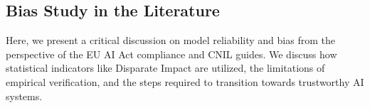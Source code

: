 \documentclass{name}
\begin{document}

\subsection{Bias Study in the Literature}
Here, we present a critical discussion on model reliability and bias from the perspective of the EU AI Act compliance and CNIL guides. We discuss how statistical indicators like Disparate Impact are utilized, the limitations of empirical verification, and the steps required to transition towards trustworthy AI systems.

\printbibliography
\end{document}
